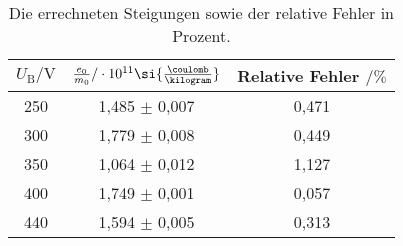 \begin{table}[htbp]
	\centering
	\caption{Die errechneten Steigungen sowie der relative Fehler in Prozent.}
	\label{tab:zusammenfassung}
	\begin{tabular}{c c c}
		\toprule
		$U_\text{B} / \si{\volt}$ & $\frac{e_0}{m_0} / \cdot 10^{11}  \si{\frac{\coulomb}{\kilogram}}$ & Relative Fehler $ / \si{\percent}$\\
		\midrule
	    250 & 1,485 $\pm$ 0,007 & 0,471 \\
	    300 & 1,779 $\pm$ 0,008 & 0,449 \\
	    350 & 1,064 $\pm$ 0,012 & 1,127 \\
	    400 & 1,749 $\pm$ 0,001 & 0,057 \\
	    440 & 1,594 $\pm$ 0,005 & 0,313 \\
		\bottomrule
	\end{tabular}
\end{table}
\FloatBarrier


